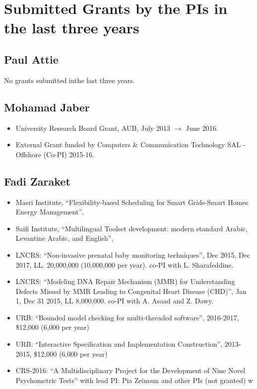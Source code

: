\section{Submitted Grants by the PIs in the last three years}

\subsection{Paul Attie}

No grants submitted inthe last three years.



\subsection{Mohamad Jaber}
\begin{itemize}
\item{University Research Board Grant, AUB, July 2013 $\rightarrow$ June 2016.}
\item{External Grant funded by Computers \& Communication Technology SAL - Offshore (Co-PI) 2015-16.}
\end{itemize}


\subsection{Fadi Zaraket}

\begin{itemize}
\item Masri Institute, ``Flexibility-based Scheduling for Smart Grids-Smart Homes Energy Management'', 

\item Saifi Institute, ``Multilingual Toolset development: modern standard Arabic, Levantine Arabic, and English'', 

\item LNCRS: ``Non-invasive prenatal baby monitoring techniques'', 
  Dec 2015, Dec 2017, LL. 20,000,000 (10,000,000 per year). co-PI with L. Sharafeddine. 

\item LNCRS: ``Modeling DNA Repair Mechanism (MMR) for Understanding Defects Missed by MMR Leading to  Congenital Heart Disease (CHD)'',
    Jan 1, Dec 31 2015, LL 8,000,000.  co-PI with A. Asaad and Z. Dawy. 

\item URB: ``Bounded model checking for multi-threaded software'', 2016-2017, \$12,000 (6,000 per year) 

\item URB: ``Interactive Specification and Implementation Construction'', 2013-2015, \$12,000 (6,000 per year) 

\item CRS-2016: ``A Multidisciplinary Project for the Development of Nine Novel Psychometric Tests'' with lead PI: Pia Zeinoun and other PIs (not granted) 
w

\end{itemize}

